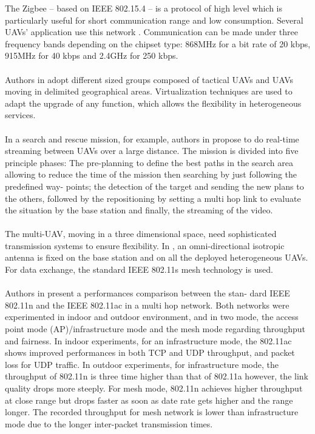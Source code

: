 \documentclass[11pt,openany]{book}
\begin{document}
The Zigbee – based on IEEE 802.15.4 – is a protocol of high level which is particularly useful for short communication range and low consumption. Several UAVs’ application use this network \cite{asadpour2014routing}. Communication can be made under three frequency bands depending on the chipset type: 868MHz for a bit rate of 20 kbps, 915MHz for 40 kbps and 2.4GHz for 250 kbps.\\\\
Authors in \cite{vidal2015multi} adopt diﬀerent sized groups composed of tactical UAVs and UAVs moving in delimited geographical areas. Virtualization techniques are used to adapt the upgrade of any function, which allows the ﬂexibility in heterogeneous services.\\\\
In a search and rescue mission, for example, authors in \cite{scherer2015autonomous} propose to do real-time streaming between UAVs over a large distance. The mission is divided into ﬁve principle phases: The pre-planning to deﬁne the best paths in the search area allowing to reduce the time of the mission then searching by just following the predeﬁned way- points; the detection of the target and sending the new plans to the others, followed by the repositioning by setting a multi hop link to evaluate the situation by the base station and ﬁnally, the streaming of the video.\\\\
The multi-UAV, moving in a three dimensional space, need sophisticated transmission systems to ensure ﬂexibility. In \cite{scherer2015autonomous}, an omni-directional isotropic antenna is ﬁxed on the base station and on all the deployed heterogeneous UAVs. For data exchange, the standard IEEE 802.11s mesh technology is used.\\\\
Authors in \cite{hayat2015experimental} present a performances comparison between the stan- dard IEEE 802.11n and the IEEE 802.11ac in a multi hop network. Both networks were experimented in indoor and outdoor environment, and in two mode, the access point mode (AP)/infrastructure mode and the mesh mode regarding throughput and fairness. In indoor experiments, for an infrastructure mode, the 802.11ac shows improved performances in both TCP and UDP throughput, and packet loss for UDP traﬃc. In outdoor experiments, for infrastructure mode, the throughput of 802.11n is three time higher than that of 802.11a however, the link quality drops more steeply. For mesh mode, 802.11n achieves higher throughput at close range but drops faster as soon as date rate gets higher and the range longer. The recorded throughput for mesh network is lower than infrastructure mode due to the longer inter-packet transmission times.\\\\
\end{document}
